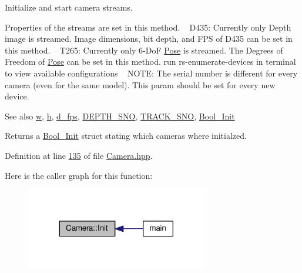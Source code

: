 Initialize and start camera streams. 

Properties of the streams are set in this method. ~\newline
 D435\+: Currently only Depth image is streamed. Image dimensions, bit depth, and F\+PS of D435 can be set in this method. ~\newline
 T265\+: Currently only 6-\/\+DoF \hyperlink{structPose}{Pose} is streamed. The Degrees of Freedom of \hyperlink{structPose}{Pose} can be set in this method. run rs-\/enumerate-\/devices in terminal to view available configurations ~\newline
 N\+O\+TE\+: The serial number is different for every camera (even for the same model). This param should be set for every new device. \begin{DoxySeeAlso}{See also}
\hyperlink{Camera_8hpp_a66326676d44c838441a4dc39c85f599b}{w}, \hyperlink{Camera_8hpp_a3f40fea9b1040e381f08ddd4b026765d}{h}, \hyperlink{Camera_8hpp_ad56e71b7cc91ce32f920769b6eb31e03}{d\+\_\+fps}, \hyperlink{Camera_8hpp_a08da237113fcf4a0fb79c89a2ba02bce}{D\+E\+P\+T\+H\+\_\+\+S\+NO}, \hyperlink{Camera_8hpp_a97168636c8d72f641dc410554a42b2ec}{T\+R\+A\+C\+K\+\_\+\+S\+NO}, \hyperlink{structBool__Init}{Bool\+\_\+\+Init} 
\end{DoxySeeAlso}
\begin{DoxyReturn}{Returns}
a \hyperlink{structBool__Init}{Bool\+\_\+\+Init} struct stating which cameras where initialzed. 
\end{DoxyReturn}


Definition at line \hyperlink{Camera_8hpp_source_l00135}{135} of file \hyperlink{Camera_8hpp_source}{Camera.\+hpp}.



Here is the caller graph for this function\+:\nopagebreak
\begin{figure}[H]
\begin{center}
\leavevmode
\includegraphics[width=225pt]{classCamera_a7f09b843d9b3a97e78eefcebbc53e054_icgraph}
\end{center}
\end{figure}




